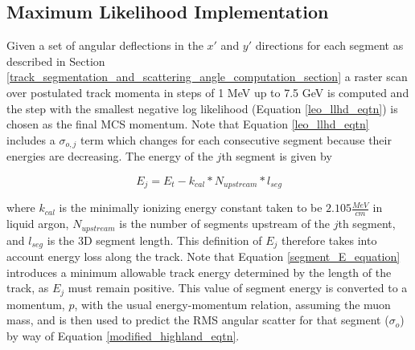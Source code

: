 \documentclass[a4paper,11pt]{article}
\begin{document}











\subsection{Maximum Likelihood Implementation}\label{maximum_likelihood_section}

Given a set of angular deflections in the $x'$ and $y'$ directions for each segment as described in Section \ref{track_segmentation_and_scattering_angle_computation_section} a raster scan over postulated track momenta in steps of 1 MeV up to 7.5 GeV is computed and the step with the smallest negative log likelihood (Equation \ref{leo_llhd_eqtn}) is chosen as the final MCS momentum. Note that Equation \ref{leo_llhd_eqtn} includes a $\sigma_{o,j}$ term which changes for each consecutive segment because their energies are decreasing. The energy of the $j$th segment is given by

\begin{equation}\label{segment_E_equation}
E_{j} = E_t - k_{cal}*N_{upstream}*l_{seg}
\end{equation}

where $k_{cal}$ is the minimally ionizing energy constant taken to be $2.105 \frac{MeV}{cm}$ in liquid argon\cite{MIPenergysource}, $N_{upstream}$ is the number of segments upstream of the $j$th segment, and $l_{seg}$ is the 3D segment length. This definition of $E_j$ therefore takes into account energy loss along the track. Note that Equation \ref{segment_E_equation} introduces a minimum allowable track energy determined by the length of the track, as $E_{j}$ must remain positive. This value of segment energy is converted to a momentum, $p$, with the usual energy-momentum relation, assuming the muon mass, and is then used to predict the RMS angular scatter for that segment ($\sigma_o$) by way of Equation \ref{modified_highland_eqtn}. 
\end{document}
